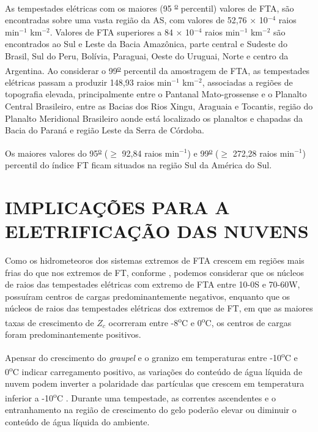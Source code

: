 As tempestades elétricas com os maiores (95 \textsuperscript{\underline{o}} percentil) valores de FTA, são encontradas sobre uma vasta região da AS, com valores de 52,76 $\times$ 10$^{-4}$ raios min$^{-1}$ km$^{-2}$. Valores de FTA superiores a 84 $\times$ 10$^{-4}$ raios min$^{-1}$ km$^{-2}$ são encontrados ao Sul e Leste da Bacia Amazônica, parte central e Sudeste do Brasil, Sul do Peru, Bolívia, Paraguai, Oeste do Uruguai, Norte e centro da Argentina. Ao considerar o 99\textsuperscript{\underline{o}} percentil da amostragem de FTA, as tempestades elétricas passam a produzir 148,93 raios min$^{-1}$ km$^{-2}$, associadas a regiões de topografia elevada, principalmente entre o Pantanal Mato-grossense e o Planalto Central Brasileiro, entre as Bacias dos Rios Xingu, Araguaia e Tocantis, região do Planalto Meridional Brasileiro aonde está localizado os planaltos e chapadas da Bacia do Paraná e região Leste da Serra de Córdoba.


Os maiores valores do 95\textsuperscript{\underline{o}} ($\geq$ 92,84 raios min$^{-1}$) e 99\textsuperscript{\underline{o}} ($\geq$ 272,28 raios min$^{-1}$) percentil do índice FT ficam situados na região Sul da América do Sul.




\section{IMPLICAÇÕES PARA A ELETRIFICAÇÃO DAS NUVENS}



Como os hidrometeoros dos sistemas extremos de FTA crescem em regiões mais frias do que nos extremos de FT,
conforme , podemos considerar que os núcleos de raios das tempestades elétricas com extremo de FTA entre 10-0S e 70-60W, possuíram centros de cargas predominantemente negativos, enquanto que os núcleos de raios das tempestades elétricas dos extremos de FT, em que as maiores taxas de crescimento de $Z_c$ ocorreram entre -8\textsuperscript{o}C e 0\textsuperscript{o}C, os centros de cargas foram predominantemente positivos.

Apensar do crescimento do \textit{graupel} e o granizo em temperaturas entre -10\textsuperscript{o}C e 0\textsuperscript{o}C indicar carregamento positivo, as variações do conteúdo de água líquida de nuvem  podem inverter a polaridade das partículas que crescem em temperatura inferior a -10\textsuperscript{o}C \cite{Takahashi1978}. Durante uma tempestade, as correntes ascendentes e o entranhamento na região de crescimento do gelo poderão elevar ou diminuir o conteúdo de água líquida do ambiente.


